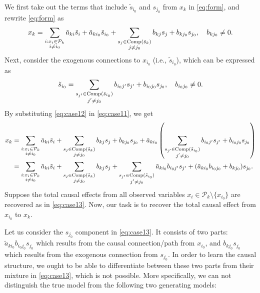 \documentclass[12pt]{article}
\newcommand{\bW}{\mathbf{W}}
\begin{document}
We first take out the terms that include $\tilde{s}_{i_0}$ and $s_{j_0}$ from $x_k$ in \eqref{eq:form}, and rewrite \eqref{eq:form} as
\begin{align}
x_k = \sum_{\substack{i:x_i\in \mathcal{P}_k\\ i\neq i_0}} \tilde{a}_{k i} \tilde{s}_{i} + \tilde{a}_{k i_0} \tilde{s}_{i_0} + \sum_{\substack{s_j\in {\rm{Comp}}(\tilde{s}_k)\\ j\neq j_0}} b_{kj} s_j + b_{kj_0} s_{j_0} ,\quad b_{kj_0}\neq 0.
\label{eq:case11}
\end{align}
Next, consider the exogenous connections to $x_{i_0}$ (i.e., $\tilde{s}_{i_0}$), which can be expressed as
\begin{align}
\tilde{s}_{i_0} =  \sum_{\substack{s_{j'}\in {\rm{Comp}}(\tilde{s}_{i_0})\\ j'\neq j_0}} b_{i_0j'} s_{j'} + b_{i_0 j_0}s_{j_0},\quad b_{i_0 j_0}\neq 0.
\label{eq:case12}
\end{align}
By substituting \eqref{eq:case12} in \eqref{eq:case11}, we get
\begin{align} 
x_k &= \sum_{\substack{i:x_i\in \mathcal{P}_k\\ i\neq i_0}} \tilde{a}_{k i} \tilde{s}_{i} + \sum_{\substack{s_j\in {\rm{Comp}}(\tilde{s}_k)\\ j\neq j_0}} b_{kj} s_j + b_{kj_0} s_{j_0} + \tilde{a}_{k i_0} \left(\sum_{\substack{s_{j'}\in {\rm{Comp}}(\tilde{s}_{i_0})\\ j'\neq j_0}} b_{i_0j'} s_{j'} + b_{i_0 j_0}s_{j_0} \right) \nonumber \\
\label{eq:case13} 
&= \sum_{\substack{i:x_i\in \mathcal{P}_k\\ i\neq i_0}} \tilde{a}_{k i} \tilde{s}_{i} + \sum_{\substack{s_j\in {\rm{Comp}}(\tilde{s}_k)\\ j\neq j_0}} b_{kj} s_j +\sum_{\substack{s_{j'}\in {\rm{Comp}}(\tilde{s}_{i_0})\\ j'\neq j_0}} \tilde{a}_{k i_0} b_{i_0j'} s_{j'} + (\tilde{a}_{k i_0} b_{i_0 j_0} +  b_{kj_0} ) s_{j_0}.
\end{align}
Suppose the total causal effects from all observed variables $x_i\in\mathcal{P}_k\setminus \{x_{i_0}\}$ are recovered as in \eqref{eq:case13}. Now, our task is to recover the total causal effect from $x_{i_0}$ to $x_k$. 

Let us consider the $s_{j_0}$ component in \eqref{eq:case13}. It consists of two parts: $\tilde{a}_{k i_0} b_{i_0 j_0}s_{j_0}$ which results from the causal connection/path from $x_{i_0}$, and $b_{k j_0} s_{j_0}$ which results from the exogenous connection from $s_{j_0}$. In order to learn the causal structure, we ought to be able to differentiate between these two parts from their mixture in \eqref{eq:case13}, which is not possible. More specifically, we can not distinguish the true model from the following two generating models:
\end{document}
